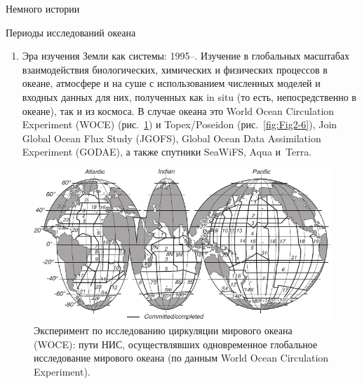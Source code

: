 \begin{chapter}{Немного истории}
\begin{section}{Периоды исследований океана}
\begin{enumerate}
\item
Эра изучения Земли как системы: 1995--. Изучение в глобальных масштабах
взаимодействия биологических, химических и физических
процессов в океане, атмосфере и на суше с использованием численных моделей
и входных данных для них, полученных как in situ (то есть, непосредственно 
в океане), так и из космоса. В случае океана это
World Ocean Circulation Experiment (WOCE) (рис.~\ref{fig:wocesurvey}) 
и Topex/Poseidon (рис.~\ref{fig:Fig2-6}), Join Global
Ocean Flux Study (JGOFS), Global Ocean Data Assimilation Experiment (GODAE),
а также спутники SeaWiFS, Aqua и~Terra.
%
\end{enumerate}

\begin{figure}[t!]
\includegraphics{pics/wocesurvey}
\caption{Эксперимент по исследованию циркуляции мирового океана (WOCE):
пути НИС, осуществлявших одновременное глобальное исследование мирового океана
(по данным World Ocean Circulation Experiment).}
\label{fig:wocesurvey}
\vspace{-3ex}
\end{figure}
%
%


\end{section}
\end{chapter}
